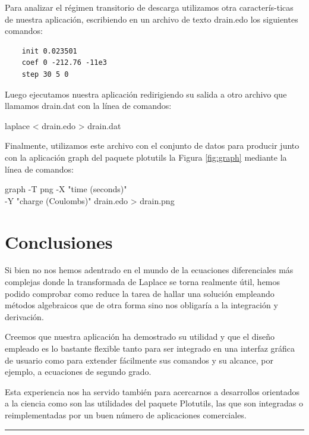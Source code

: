 \documentclass[a4paper]{article}
\begin{document}
Para analizar el régimen transitorio de descarga 
utilizamos otra caracterís-ticas de nuestra aplicación, 
escribiendo en un archivo de texto {\ttfamily 
drain.edo} los siguientes comandos:

\begin{verbatim}
    init 0.023501
    coef 0 -212.76 -11e3
    step 30 5 0
\end{verbatim}

Luego ejecutamos nuestra aplicación redirigiendo su
salida a otro archivo que llamamos {\ttfamily drain.dat}
 con la línea de comandos:

\begin{center}\ttfamily
    laplace < drain.edo > drain.dat
\end{center}

Finalmente, utilizamos este archivo con el conjunto
de datos para producir junto con 
la aplicación {\ttfamily graph} del paquete {\ttfamily 
plotutils} la Figura \ref{fig:graph} mediante la línea 
de comandos:

\begin{center}\ttfamily
    graph -T png -X "time (seconds)" \\ -Y "charge (Coulombs)" drain.edo > drain.png
\end{center}

\section{Conclusiones}

Si bien no nos hemos adentrado en el mundo de la ecuaciones
diferenciales más complejas donde la transformada de 
Laplace se torna realmente útil, hemos podido 
comprobar como reduce la tarea de hallar una solución 
empleando métodos algebraicos que de otra forma sino nos
obligaría a la integración y derivación.

Creemos que nuestra aplicación ha demostrado su utilidad
y que el diseño empleado es lo bastante flexible tanto
para ser integrado en una interfaz gráfica de usuario como
para extender fácilmente sus comandos y su alcance, por 
ejemplo, a ecuaciones de segundo grado.

Esta experiencia nos ha servido también para acercarnos a 
desarrollos orientados a la ciencia como son las utilidades
del paquete Plotutils, las que son integradas o 
reimplementadas por un buen número de aplicaciones 
comerciales.

\noindent\rule{\textwidth}{1pt}
\end{document}
